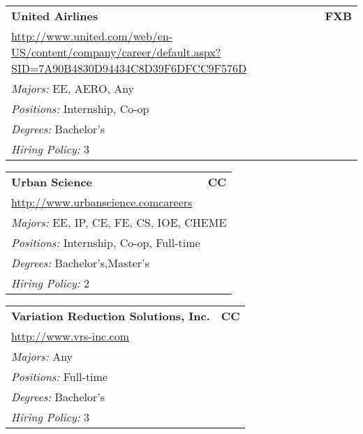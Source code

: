 \documentclass[twoside]{article}
\begin{document}
\begin{center}
\begin{multicols}{3}
\begin{FlushLeft}
\begin{minipage}{.9\columnwidth}
\end{minipage}
 
\begin{minipage}{.9\columnwidth}\begin{tabularx}{.95\columnwidth}{Xr}
                 {\Large\bf United Airlines} & {\Large\bf FXB}\\
    \multicolumn{2}{p{.95\columnwidth}}{\url{http://www.united.com/web/en-US/content/company/career/default.aspx?SID=7A90B4830D94434C8D39F6DFCC9F576D}}\\
    \multicolumn{2}{p{.95\columnwidth}}{\emph{Majors:} EE, AERO, Any}\\
    \multicolumn{2}{p{.95\columnwidth}}{\emph{Positions:} Internship, Co-op}\\
    \multicolumn{2}{p{.95\columnwidth}}{\emph{Degrees:} Bachelor's}\\
    \multicolumn{2}{p{.95\columnwidth}}{\emph{Hiring Policy:} 3}\\
    \end{tabularx}
    
\end{minipage}
 
\begin{minipage}{.9\columnwidth}\begin{tabularx}{.95\columnwidth}{Xr}
                 {\Large\bf Urban Science} & {\Large\bf CC}\\
    \multicolumn{2}{p{.95\columnwidth}}{\url{http://www.urbanscience.comcareers}}\\
    \multicolumn{2}{p{.95\columnwidth}}{\emph{Majors:} EE, IP, CE, FE, CS, IOE, CHEME}\\
    \multicolumn{2}{p{.95\columnwidth}}{\emph{Positions:} Internship, Co-op, Full-time}\\
    \multicolumn{2}{p{.95\columnwidth}}{\emph{Degrees:} Bachelor's,Master's}\\
    \multicolumn{2}{p{.95\columnwidth}}{\emph{Hiring Policy:} 2}\\
    \end{tabularx}
    
\end{minipage}
 
\begin{minipage}{.9\columnwidth}\begin{tabularx}{.95\columnwidth}{Xr}
                 {\Large\bf Variation Reduction Solutions, Inc.} & {\Large\bf CC}\\
    \multicolumn{2}{p{.95\columnwidth}}{\url{http://www.vrs-inc.com}}\\
    \multicolumn{2}{p{.95\columnwidth}}{\emph{Majors:} Any}\\
    \multicolumn{2}{p{.95\columnwidth}}{\emph{Positions:} Full-time}\\
    \multicolumn{2}{p{.95\columnwidth}}{\emph{Degrees:} Bachelor's}\\
    \multicolumn{2}{p{.95\columnwidth}}{\emph{Hiring Policy:} 3}\\
    \end{tabularx}
    

\end{minipage}
\end{FlushLeft}
\end{multicols}
\end{center}
\end{document}
